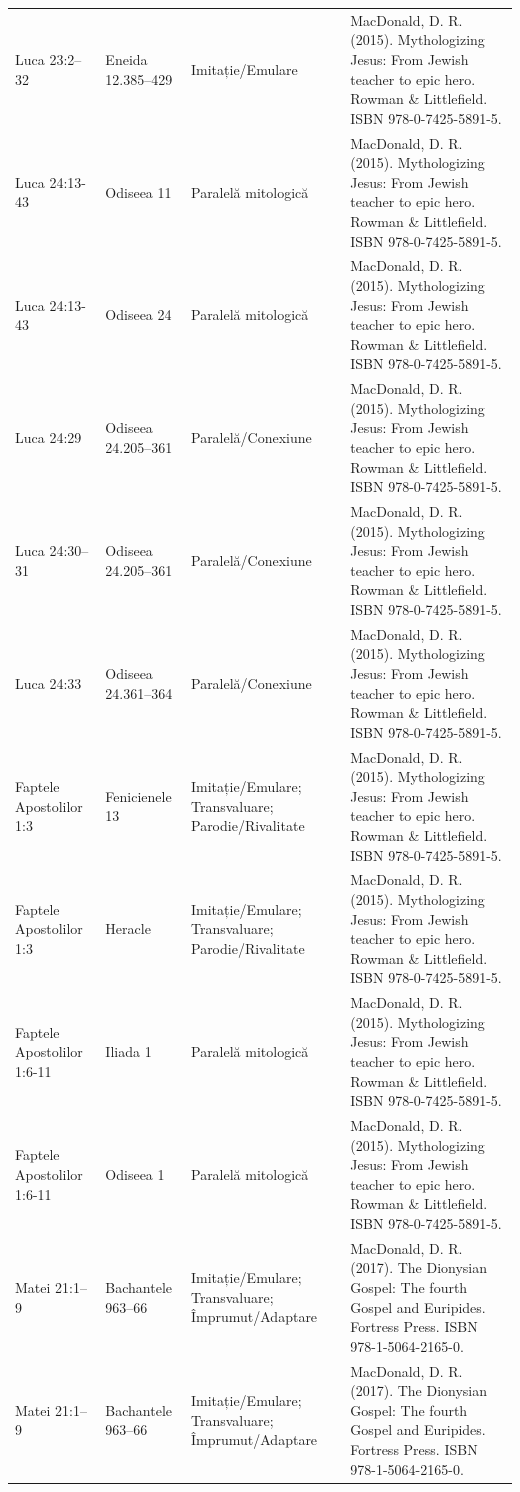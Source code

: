 \documentclass[12pt,a4paper,twoside,openany]{book}
\begin{document}
\begin{longtable}{L{1.4cm}L{1.7cm}L{3.1cm}L{8.4cm}}
Luca 23:2–32 & Eneida 12.385–429 & Imitație/Emulare & MacDonald, D. R. (2015). Mythologizing Jesus: From Jewish teacher to epic hero. Rowman \& Littlefield. ISBN 978-0-7425-5891-5. \\
Luca 24:13-43 & Odiseea 11 & Paralelă mitologică & MacDonald, D. R. (2015). Mythologizing Jesus: From Jewish teacher to epic hero. Rowman \& Littlefield. ISBN 978-0-7425-5891-5. \\
Luca 24:13-43 & Odiseea 24 & Paralelă mitologică & MacDonald, D. R. (2015). Mythologizing Jesus: From Jewish teacher to epic hero. Rowman \& Littlefield. ISBN 978-0-7425-5891-5. \\
Luca 24:29 & Odiseea 24.205–361 & Paralelă/Conexiune & MacDonald, D. R. (2015). Mythologizing Jesus: From Jewish teacher to epic hero. Rowman \& Littlefield. ISBN 978-0-7425-5891-5. \\
Luca 24:30–31 & Odiseea 24.205–361 & Paralelă/Conexiune & MacDonald, D. R. (2015). Mythologizing Jesus: From Jewish teacher to epic hero. Rowman \& Littlefield. ISBN 978-0-7425-5891-5. \\
Luca 24:33 & Odiseea 24.361–364 & Paralelă/Conexiune & MacDonald, D. R. (2015). Mythologizing Jesus: From Jewish teacher to epic hero. Rowman \& Littlefield. ISBN 978-0-7425-5891-5. \\
Faptele Apostolilor 1:3 & Fenicienele 13 & Imitație/Emulare; Transvaluare; Parodie/Rivalitate & MacDonald, D. R. (2015). Mythologizing Jesus: From Jewish teacher to epic hero. Rowman \& Littlefield. ISBN 978-0-7425-5891-5. \\
Faptele Apostolilor 1:3 & Heracle & Imitație/Emulare; Transvaluare; Parodie/Rivalitate & MacDonald, D. R. (2015). Mythologizing Jesus: From Jewish teacher to epic hero. Rowman \& Littlefield. ISBN 978-0-7425-5891-5. \\
Faptele Apostolilor 1:6-11 & Iliada 1 & Paralelă mitologică & MacDonald, D. R. (2015). Mythologizing Jesus: From Jewish teacher to epic hero. Rowman \& Littlefield. ISBN 978-0-7425-5891-5. \\
Faptele Apostolilor 1:6-11 & Odiseea 1 & Paralelă mitologică & MacDonald, D. R. (2015). Mythologizing Jesus: From Jewish teacher to epic hero. Rowman \& Littlefield. ISBN 978-0-7425-5891-5. \\
Matei 21:1–9 & Bachantele 963–66 & Imitație/Emulare; Transvaluare; Împrumut/Adaptare & MacDonald, D. R. (2017). The Dionysian Gospel: The fourth Gospel and Euripides. Fortress Press. ISBN 978-1-5064-2165-0. \\
Matei 21:1–9 & Bachantele 963–66 & Imitație/Emulare; Transvaluare; Împrumut/Adaptare & MacDonald, D. R. (2017). The Dionysian Gospel: The fourth Gospel and Euripides. Fortress Press. ISBN 978-1-5064-2165-0. \\

\end{longtable}
\end{document}
